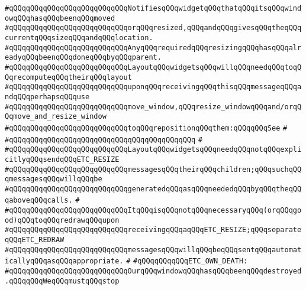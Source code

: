 \verb|#qQQqqQQqqQQqqQQqqQQqqQQqqQQqNotifiesqQQqwidgetqQQqthatqQQqitsqQQqwindowqQQqhasqQQqbeenqQQqmoved|\newline
\verb|#qQQqqQQqqQQqqQQqqQQqqQQqqQQqorqQQqresized,qQQqandqQQqgivesqQQqtheqQQqcurrentqQQqsizeqQQqandqQQqlocation.|\newline
\verb|#qQQqqQQqqQQqqQQqqQQqqQQqqQQqAnyqQQqrequiredqQQqresizingqQQqhasqQQqalreadyqQQqbeenqQQqdoneqQQqbyqQQqparent.|\newline
\verb|#qQQqqQQqqQQqqQQqqQQqqQQqqQQqLayoutqQQqwidgetsqQQqwillqQQqneedqQQqtoqQQqrecomputeqQQqtheirqQQqlayout|\newline
\verb|#qQQqqQQqqQQqqQQqqQQqqQQqqQQquponqQQqreceivingqQQqthisqQQqmessageqQQqandqQQqperhapsqQQquse|\newline
\verb|#qQQqqQQqqQQqqQQqqQQqqQQqqQQqmove_window,qQQqresize_windowqQQqand/orqQQqmove_and_resize_window|\newline
\verb|#qQQqqQQqqQQqqQQqqQQqqQQqqQQqtoqQQqrepositionqQQqthem:qQQqqQQqSee|\newline
\verb|#|\newline
\verb|#qQQqqQQqqQQqqQQqqQQqqQQqqQQqqQQqqQQqqQQqqQQq|\newline
\verb|#|\newline
\verb|#qQQqqQQqqQQqqQQqqQQqqQQqqQQqLayoutqQQqwidgetsqQQqneedqQQqnotqQQqexplicitlyqQQqsendqQQqETC_RESIZE|\newline
\verb|#qQQqqQQqqQQqqQQqqQQqqQQqqQQqmessagesqQQqtheirqQQqchildren;qQQqsuchqQQqmessagesqQQqwillqQQqbe|\newline
\verb|#qQQqqQQqqQQqqQQqqQQqqQQqqQQqgeneratedqQQqasqQQqneededqQQqbyqQQqtheqQQqaboveqQQqcalls.|\newline
\verb|#|\newline
\verb|#qQQqqQQqqQQqqQQqqQQqqQQqqQQqItqQQqisqQQqnotqQQqnecessaryqQQq(orqQQqgood)qQQqtoqQQqredrawqQQqupon|\newline
\verb|#qQQqqQQqqQQqqQQqqQQqqQQqqQQqreceivingqQQqaqQQqETC_RESIZE;qQQqseparateqQQqETC_REDRAW|\newline
\verb|#qQQqqQQqqQQqqQQqqQQqqQQqqQQqmessagesqQQqwillqQQqbeqQQqsentqQQqautomaticallyqQQqasqQQqappropriate.|\newline
\verb|#|\newline
\verb|#qQQqqQQqqQQqETC_OWN_DEATH:|\newline
\verb|#qQQqqQQqqQQqqQQqqQQqqQQqqQQqOurqQQqwindowqQQqhasqQQqbeenqQQqdestroyed.qQQqqQQqWeqQQqmustqQQqstop|\newline
